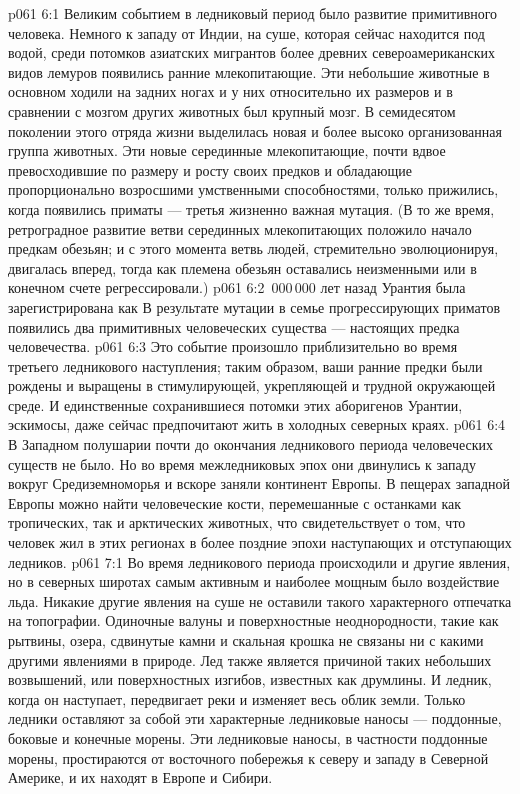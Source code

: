 \vs p061 6:1 Великим событием в ледниковый период было развитие примитивного человека. Немного к западу от Индии, на суше, которая сейчас находится под водой, среди потомков азиатских мигрантов более древних североамериканских видов лемуров  появились ранние млекопитающие. Эти небольшие животные в основном ходили на задних ногах и у них относительно их размеров и в сравнении с мозгом других животных был крупный мозг. В семидесятом поколении этого отряда жизни  выделилась новая и более высоко организованная группа животных. Эти новые серединные млекопитающие, почти вдвое превосходившие по размеру и росту своих предков и обладающие пропорционально возросшими умственными способностями, только прижились, когда  появились приматы --- третья жизненно важная мутация. (В то же время, ретроградное развитие ветви серединных млекопитающих положило начало предкам обезьян; и с этого момента ветвь людей, стремительно эволюционируя, двигалась вперед, тогда как племена обезьян оставались неизменными или в конечном счете регрессировали.)
\vs p061 6:2 \,000\,000 лет назад Урантия была зарегистрирована как  В результате мутации в семье прогрессирующих приматов  появились два примитивных человеческих существа --- настоящих предка человечества.
\vs p061 6:3 Это событие произошло приблизительно во время третьего ледникового наступления; таким образом, ваши ранние предки были рождены и выращены в стимулирующей, укрепляющей и трудной окружающей среде. И единственные сохранившиеся потомки этих аборигенов Урантии, эскимосы, даже сейчас предпочитают жить в холодных северных краях.
\vs p061 6:4 \pc В Западном полушарии почти до окончания ледникового периода человеческих существ не было. Но во время межледниковых эпох они двинулись к западу вокруг Средиземноморья и вскоре заняли континент Европы. В пещерах западной Европы можно найти человеческие кости, перемешанные с останками как тропических, так и арктических животных, что свидетельствует о том, что человек жил в этих регионах в более поздние эпохи наступающих и отступающих ледников.
\vs p061 7:1 Во время ледникового периода происходили и другие явления, но в северных широтах самым активным и наиболее мощным было воздействие льда. Никакие другие явления на суше не оставили такого характерного отпечатка на топографии. Одиночные валуны и поверхностные неоднородности, такие как рытвины, озера, сдвинутые камни и скальная крошка не связаны ни с какими другими явлениями в природе. Лед также является причиной таких небольших возвышений, или поверхностных изгибов, известных как друмлины. И ледник, когда он наступает, передвигает реки и изменяет весь облик земли. Только ледники оставляют за собой эти характерные ледниковые наносы --- поддонные, боковые и конечные морены. Эти ледниковые наносы, в частности поддонные морены, простираются от восточного побережья к северу и западу в Северной Америке, и их находят в Европе и Сибири.
